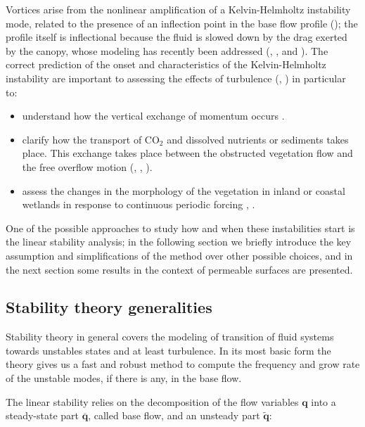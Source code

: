 Vortices arise from the nonlinear amplification of a Kelvin-Helmholtz instability mode, related to the presence of an inflection point in the base flow profile (\citet{asaeda2005morphological}); the profile itself is inflectional because the fluid is slowed down by the drag exerted by the canopy, whose modeling has recently been addressed (\citet{py2004mixing}, \citet{singh2016linear},  \citet{zampogna2016instability} and \citet{tilton2008linear}).
The correct prediction of the onset and characteristics of the Kelvin-Helmholtz instability are important to assessing the effects of turbulence (\citet{finnigan2000turbulence}, \citet{jimenez2001turbulent}) in particular to:

\begin{itemize}
	\item understand how the vertical exchange of momentum occurs \citet{ikeda1996three}.
	\item clarify how the transport of $\text{CO}_2$ and dissolved nutrients or sediments takes place. This exchange takes place between the
	obstructed vegetation flow and the free overflow motion (\citet{gambi1990flume}, \citet{eckman1987role}, \citet{grizzle1996hydrodynamically}).
	\item assess the changes in the morphology of the vegetation in inland or coastal wetlands in
	response to continuous periodic forcing \citet{asaeda2005morphological}, \citet{patil2010characteristics}.
\end{itemize}

One of the possible approaches to study how and when these instabilities start is the linear stability analysis; in the following section we briefly introduce the key assumption and simplifications of the method over other possible choices, and in the next section some results in the context of permeable surfaces are presented.


\subsection{Stability theory generalities}

Stability theory in general covers the modeling of transition of fluid systems towards unstables states and at least turbulence.
In its most basic form the theory gives us a fast and robust method to compute the frequency and grow rate of the unstable modes, if there is any, in the base flow.

The linear stability relies on the decomposition of the flow variables $\mathbf{q}$ into a steady-state part $\overline{\mathbf{q}}$, called base flow, and an unsteady part $\widetilde{\mathbf{q}}$:


